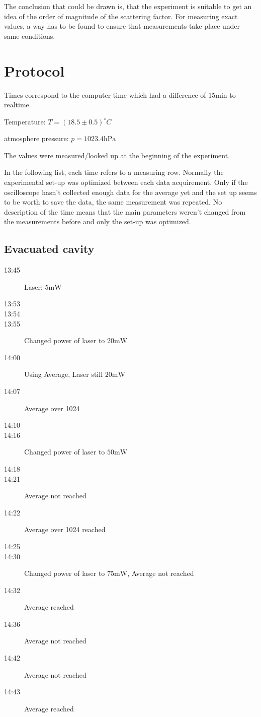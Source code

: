 \documentclass[
	parskip=half,10pt,
	numbers= noenddot, %
	toc=flat, %
	oneside,
	twocolumn,
	]{scrartcl}
\begin{document}
The conclusion that could be drawn is, that the experiment is suitable to get an idea of the order of magnitude of the scattering factor. For measuring exact values, a way has to be found to ensure that measurements take place under same conditions.

\section{Protocol}
Times correspond to the computer time which had a difference of 15min to realtime.

Temperature: $T=(18.5\pm 0.5)^\circ C$

atmosphere pressure: $p=1023.4\si{\hecto \pascal}$\cite{wetter}

The values were measured/looked up at the beginning of the experiment.

In the following list, each time refers to a measuring row. Normally the experimental set-up was optimized between each data acquirement. Only if the oscilloscope hasn't collected enough data for the average yet and the set up seems to be worth to save the data, the same measurement was repeated.
No description of the time means that the main parameters weren't changed from the measurements before and only the set-up was optimized. 
\subsection*{Evacuated cavity}  
\begin{description}
\item[13:45] Laser: $5\si{\milli \watt}$
\item[13:53]
\item[13:54]
\item[13:55] Changed power of laser to $20\si{\milli \watt}$
\item[14:00] Using Average, Laser still $20\si{\milli \watt}$
\item[14:07] Average over 1024
\item[14:10]
\item[14:16] Changed power of laser to $50\si{\milli \watt}$
\item[14:18]
\item[14:21] Average not reached
\item[14:22] Average over 1024 reached
\item[14:25]
\item[14:30] Changed power of laser to $75\si{\milli \watt}$, Average not reached
\item[14:32] Average reached
\item[14:36] Average not reached
\item[14:42] Average not reached
\item[14:43] Average reached
\end{description}
\end{document}
